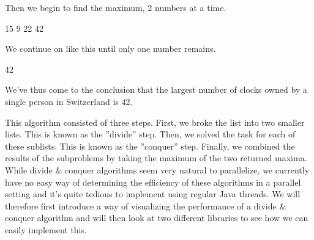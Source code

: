 \documentclass[main.tex]{subfiles}
\begin{document}
\begin{example}
    Then we begin to find the maximum, 2 numbers at a time.
    \begin{center}
        \hspace*{\fill} 15 \hspace*{\fill}  9 \hspace*{\fill} 22 \hspace*{\fill} 42 \hspace*{\fill}
    \end{center}
    We continue on like this until only one number remains.
    \begin{center}
        42
    \end{center}
    We've thus come to the conclusion that the largest number of clocks owned by a single person in Switzerland is 42.
\end{example}
This algorithm consisted of three steps. First, we broke the list into two smaller lists. This is known as the ''divide'' step. Then, we solved the task for each of these sublists. This is known as the ''conquer'' step. Finally, we combined the results of the subproblems by taking the maximum of the two returned maxima.\\[0.3cm]
While divide \& conquer algorithms seem very natural to parallelize, we currently have no easy way of determining the efficiency of these algorithms in a parallel setting and it's quite tedious to implement using regular Java threads. We will therefore first introduce a way of visualizing the performance of a divide \& conquer algorithm and will then look at two different libraries to see how we can easily implement this.

\end{document}
